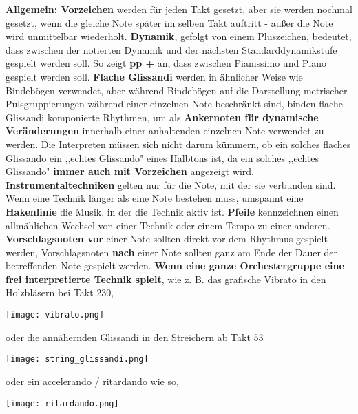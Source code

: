 \documentclass[12pt]{article}
\newcommand*\circled[1]{\tikz[baseline=(char.base)]{
            \node[shape=circle,draw,inner sep=1pt] (char) {#1};}}
\begin{document}
\begingroup
\textbf{Allgemein: \circled{1} Vorzeichen} werden für jeden Takt gesetzt, aber sie werden nochmal gesetzt, wenn die gleiche Note später im selben Takt auftritt - außer die Note wird unmittelbar wiederholt. \textbf{\circled{2} Dynamik}, gefolgt von einem Pluszeichen, bedeutet, dass zwischen der notierten Dynamik und der nächsten Standarddynamikstufe gespielt werden soll. So zeigt \textbf{pp +} an, dass zwischen Pianissimo und Piano gespielt werden soll. \textbf{\circled{3} Flache Glissandi} werden in ähnlicher Weise wie Bindebögen verwendet, aber während Bindebögen auf die Darstellung metrischer Pulsgruppierungen während einer einzelnen Note beschränkt sind, binden flache Glissandi komponierte Rhythmen, um als \textbf{Ankernoten für dynamische Veränderungen} innerhalb einer anhaltenden einzelnen Note verwendet zu werden. Die Interpreten müssen sich nicht darum kümmern, ob ein solches flaches Glissando ein ,,echtes Glissando" eines Halbtons ist, da ein solches ,,echtes Glissando" \textbf{immer auch mit Vorzeichen} angezeigt wird. \textbf{\circled{4} Instrumentaltechniken} gelten nur für die Note, mit der sie verbunden sind. Wenn eine Technik länger als eine Note bestehen muss, umspannt eine \textbf{Hakenlinie} die Musik, in der die Technik aktiv ist. \textbf{\circled{5} Pfeile} kennzeichnen einen allmählichen Wechsel von einer Technik oder einem Tempo zu einer anderen. \textbf{\circled{6} Vorschlagsnoten vor} einer Note sollten direkt vor dem Rhythmus gespielt werden, Vorschlagsnoten \textbf{nach} einer Note sollten ganz am Ende der Dauer der betreffenden Note gespielt werden. \textbf{\circled{7} Wenn eine ganze Orchestergruppe eine frei interpretierte Technik spielt}, wie z. B. das grafische Vibrato in den Holzbläsern bei Takt 230, \\ 
\begin{center}
\texttt{[image: vibrato.png]}
\end{center}
\endgroup

\begingroup
oder die annähernden Glissandi in den Streichern ab Takt 53 \\
\begin{center}
\texttt{[image: string\_glissandi.png]}
\end{center}
\endgroup

\begingroup
oder ein accelerando / ritardando wie so, \\
\begin{center}
\texttt{[image: ritardando.png]}
\end{center}
\endgroup
\end{document}
